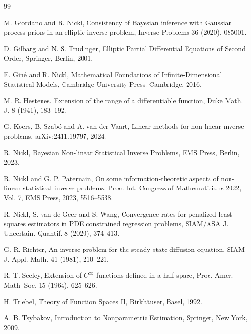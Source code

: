\documentclass[12pt]{article}
\numberwithin{equation}{section}
\begin{document}
\begin{thebibliography}{99}

M. Giordano and R. Nickl,
Consistency of Bayesian inference with Gaussian process priors in an
elliptic inverse problem,
Inverse Problems 36 (2020), 085001.

D. Gilbarg and N. S. Trudinger,
Elliptic Partial Differential Equations of Second Order,
Springer, Berlin, 2001.

E. Gin\'e and R. Nickl,
Mathematical Foundations of Infinite-Dimensional Statistical Models,
Cambridge University Press, Cambridge, 2016.

M. R. Hestenes,
Extension of the range of a differentiable function,
Duke Math. J. 8 (1941), 183--192.

G. Koers, B. Szab\'o and A. van der Vaart,
Linear methods for non-linear inverse problems,
arXiv:2411.19797, 2024.

R. Nickl,
Bayesian Non-linear Statistical Inverse Problems,
EMS Press, Berlin, 2023.

R. Nickl and G. P. Paternain,
On some information-theoretic aspects of non-linear statistical
inverse problems,
Proc. Int. Congress of Mathematicians 2022, Vol. 7, EMS Press, 2023,
5516--5538.

R. Nickl, S. van de Geer and S. Wang,
Convergence rates for penalized least squares estimators in PDE
constrained regression problems,
SIAM/ASA J. Uncertain. Quantif. 8 (2020), 374--413.

G. R. Richter,
An inverse problem for the steady state diffusion equation,
SIAM J. Appl. Math. 41 (1981), 210--221.

R. T. Seeley,
Extension of $C^\infty$ functions defined in a half space,
Proc. Amer. Math. Soc. 15 (1964), 625--626.

H. Triebel,
Theory of Function Spaces II,
Birkh\"auser, Basel, 1992.

A. B. Tsybakov,
Introduction to Nonparametric Estimation,
Springer, New York, 2009.

\end{thebibliography}
\end{document}
